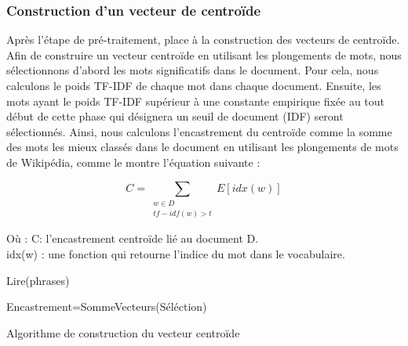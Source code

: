        \subsubsection{Construction d'un vecteur de centroïde}
        Après l'étape de pré-traitement, place à la construction des vecteurs de centroïde. Afin de construire un vecteur centroïde en utilisant les plongements de mots, nous sélectionnons d'abord les mots significatifs dans le document. Pour cela, nous calculons le poids TF-IDF de chaque mot dans chaque document. Ensuite, les mots ayant le poids TF-IDF supérieur à une constante empirique fixée au tout début de cette phase qui désignera un seuil de document (IDF) seront sélectionnés. Ainsi, nous calculons l'encastrement du centroïde comme la somme des mots les mieux classés dans le document en utilisant les plongements de mots de Wikipédia, comme le montre l'équation suivante :

             \begin{equation*}
             C = \sum_{\substack{w\in D\\
                             tf-idf(w)>t }}
                    E[idx(w)]
             \end{equation*}
             
             Où :
             C: l'encastrement centroïde lié au document D.\\
             idx(w) : une fonction qui retourne l'indice du mot dans le vocabulaire.\\
             
             \begin{algorithm2e}[H]
                \SetAlgoLined
                
                Lire(phrases)\\
                
                Encastrement=SommeVecteurs(Séléction)
                
                \caption{Algorithme de construction du vecteur centroïde}
             \end{algorithm2e}
             
